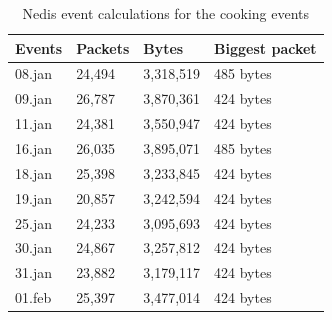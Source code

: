 \begin{table}[H]
\centering
    \caption{Nedis event calculations for the cooking events}
\label{tab:NedisCookingCalculations}
    \begin{tabular}{|l|l|l|l|}
        \hline
        \textbf{Events}    & \textbf{Packets} & \textbf{Bytes}     & \textbf{Biggest packet} \\ \hline
        08.jan             & 24,494           & 3,318,519          & 485 bytes               \\ \hline
        09.jan             & 26,787           & 3,870,361          & 424 bytes               \\ \hline
        11.jan             & 24,381           & 3,550,947          & 424 bytes               \\ \hline
        16.jan             & 26,035           & 3,895,071          & 485 bytes               \\ \hline
        18.jan             & 25,398           & 3,233,845          & 424 bytes               \\ \hline
        19.jan             & 20,857           & 3,242,594          & 424 bytes               \\ \hline
        25.jan             & 24,233           & 3,095,693          & 424 bytes               \\ \hline
        30.jan             & 24,867           & 3,257,812          & 424 bytes               \\ \hline
        31.jan             & 23,882           & 3,179,117          & 424 bytes               \\ \hline
        01.feb             & 25,397           & 3,477,014          & 424 bytes               \\ \hline
    \end{tabular}
\end{table}

